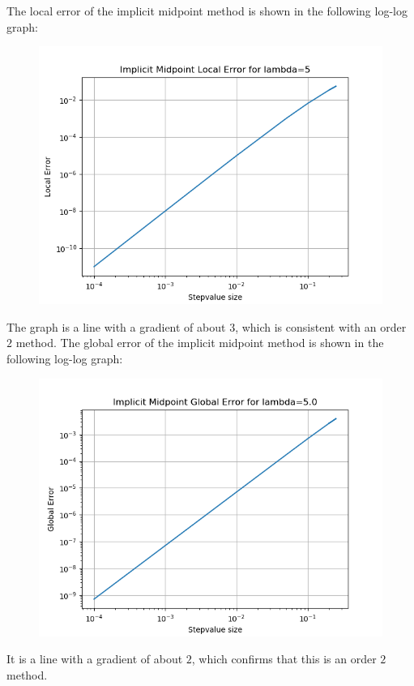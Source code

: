\documentclass{article}
\begin{document}
\begin{itemize}
\begin{figure}[H]
		\end{figure}
		The local error of the implicit midpoint
		method is shown in the following log-log graph:
		\begin{figure}[H]
			\includegraphics[scale=0.6]{implicit_mid_local_loglog}
		\end{figure}
		The graph is a line with a gradient of about $3$, which is
		consistent with an order $2$ method.
		The global error of the implicit midpoint
		method is shown in the following log-log graph:
		\begin{figure}[H]
			\includegraphics[scale=0.6]{implicit_mid_global_loglog}
		\end{figure}
		It is a line with a gradient of about $2$, which confirms that
		this is an order $2$ method.


\end{itemize}
\end{document}
